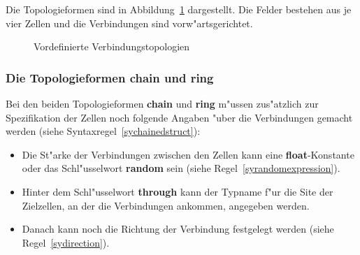 Die Topologieformen sind in Abbildung~\ref{StructTopolBild}
dargestellt. Die Felder bestehen aus je vier Zellen und die
Verbindungen sind vorw"artsgerichtet.

\begin{figure}[htbp]
  \begin{center}
     \footnotesize
	
    \caption{\label{StructTopolBild} Vordefinierte Verbindungstopologien}
  \end{center}
\end{figure}

\begin{center}
\end{center}


\subsubsection{Die Topologieformen chain und ring}

Bei den beiden Topologieformen {\bf chain} und {\bf
ring} m"ussen zus"atzlich zur Spezifikation der Zellen
noch folgende Angaben "uber die Verbindungen gemacht werden (siehe
Syntaxregel~\ref{sychainedstruct}):

\begin{itemize}
  \item Die St"arke der Verbindungen zwischen den Zellen kann  eine {\bf float}-Konstante oder das
	Schl"usselwort {\bf random} sein (siehe Regel~\ref{syrandomexpression}).
  \item Hinter dem Schl"usselwort {\bf through} kann der Typname f"ur die Site der Zielzellen, an
	der die Verbindungen ankommen, angegeben werden. 
  \item Danach kann noch die Richtung der Verbindung festgelegt werden (siehe Regel~\ref{sydirection}).
\end{itemize}

